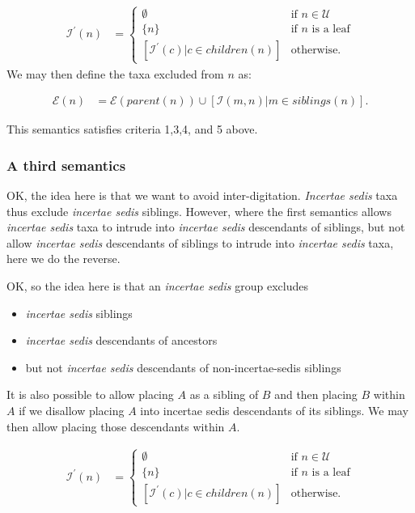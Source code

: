 \documentclass[english]{article}
\begin{document}
\begin{align*}
    \mathcal{I^{\prime}}(n) & =
    \begin{cases}
        \emptyset & \text{if }n\in\mathcal{U}\\
        \{n\} & \text{if }n\text{ is a leaf}\\
        [\mathcal{I}^{\prime}(c)|c\in children(n)] & \text{otherwise.}
\end{cases}
\end{align*} We may then define the taxa excluded from $n$
as:

\begin{align*} 
\mathcal{E}(n) & =\mathcal{E}(parent(n))\cup\left[\mathcal{I}(m,n)\big|m\in siblings(n)\right].\label{eq:exclude-set-formula-1}
\end{align*}

This semantics satisfies criteria 1,3,4, and 5 above.

\subsubsection{A third semantics}


OK, the idea here is that we want to avoid inter-digitation.
\emph{Incertae sedis} taxa thus exclude\emph{ incertae sedis}
siblings.
However, where the first semantics allows \emph{incertae
sedis }taxa to intrude into \emph{incertae sedis} descendants of
siblings, but not allow\emph{ incertae sedis} descendants of siblings
to intrude into \emph{incertae sedis} taxa, here we do the reverse.

OK, so the idea here is that an\emph{ incertae sedis} group excludes
\begin{itemize} \item \emph{incertae sedis} siblings \item
\emph{incertae sedis }descendants of ancestors \item but not\emph{
incertae sedis} descendants of non-incertae-sedis siblings
\end{itemize} It is also possible to allow placing $A$ as a sibling of
$B$ and then placing $B$ within $A$ if we disallow placing $A$ into
incertae sedis descendants of its siblings.
We may then allow placing
those descendants within $A$.

\begin{align*} \mathcal{I^{\prime}}(n) & =\begin{cases} \emptyset &
\text{if }n\in\mathcal{U}\\ \{n\} & \text{if }n\text{ is a leaf}\\{}
[\mathcal{I}^{\prime}(c)|c\in children(n)] & \text{otherwise.}
\end{cases} \end{align*}
\end{document}
